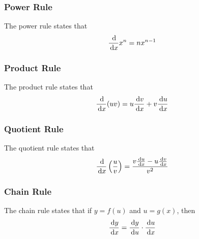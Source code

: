\subsubsection{Power Rule}

The power rule states that
\begin{equation}
  \frac{\,\mathrm{d}}{\,\mathrm{d} x} x^n=nx^{n-1}
\end{equation}

\subsubsection{Product Rule}

The product rule states that
\begin{equation}
  \frac{\,\mathrm{d}}{\,\mathrm{d} x} (uv)=u \frac{\,\mathrm{d} v}{\,\mathrm{d} x}+v\frac{\,\mathrm{d} u}{\,\mathrm{d} x}
\end{equation}

\subsubsection{Quotient Rule}

The quotient rule states that
\begin{equation}
  \frac{\,\mathrm{d}}{\,\mathrm{d} x}\left(\frac{u}{v}\right)=\frac{v\frac{\,\mathrm{d} u}{\,\mathrm{d} x}-u\frac{\,\mathrm{d} v}{\,\mathrm{d} x}}{v^2}
\end{equation}

\subsubsection{Chain Rule}

The chain rule states that if $y=f(u)$ and $u=g(x)$, then
\begin{equation}
  \frac{\,\mathrm{d} y}{\,\mathrm{d} x}=\frac{\,\mathrm{d} y}{\,\mathrm{d} u} \cdot \frac{\,\mathrm{d} u}{\,\mathrm{d} x}
\end{equation}

